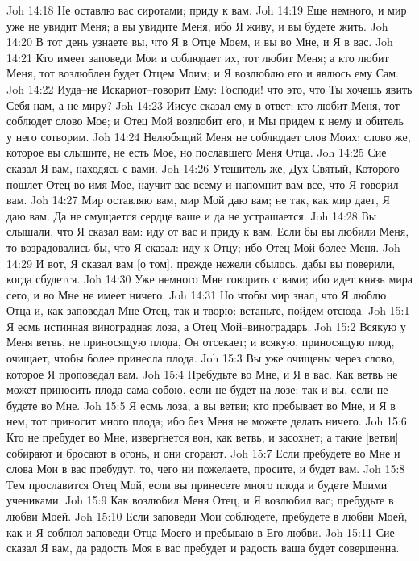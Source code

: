 Joh 14:18  Не оставлю вас сиротами; приду к вам.
Joh 14:19  Еще немного, и мир уже не увидит Меня; а вы увидите Меня, ибо Я живу, и вы будете жить.
Joh 14:20  В тот день узнаете вы, что Я в Отце Моем, и вы во Мне, и Я в вас.
Joh 14:21  Кто имеет заповеди Мои и соблюдает их, тот любит Меня; а кто любит Меня, тот возлюблен будет Отцем Моим; и Я возлюблю его и явлюсь ему Сам.
Joh 14:22  Иуда--не Искариот--говорит Ему: Господи! что это, что Ты хочешь явить Себя нам, а не миру?
Joh 14:23  Иисус сказал ему в ответ: кто любит Меня, тот соблюдет слово Мое; и Отец Мой возлюбит его, и Мы придем к нему и обитель у него сотворим.
Joh 14:24  Нелюбящий Меня не соблюдает слов Моих; слово же, которое вы слышите, не есть Мое, но пославшего Меня Отца.
Joh 14:25  Сие сказал Я вам, находясь с вами.
Joh 14:26  Утешитель же, Дух Святый, Которого пошлет Отец во имя Мое, научит вас всему и напомнит вам все, что Я говорил вам.
Joh 14:27  Мир оставляю вам, мир Мой даю вам; не так, как мир дает, Я даю вам. Да не смущается сердце ваше и да не устрашается.
Joh 14:28  Вы слышали, что Я сказал вам: иду от вас и приду к вам. Если бы вы любили Меня, то возрадовались бы, что Я сказал: иду к Отцу; ибо Отец Мой более Меня.
Joh 14:29  И вот, Я сказал вам [о том], прежде нежели сбылось, дабы вы поверили, когда сбудется.
Joh 14:30  Уже немного Мне говорить с вами; ибо идет князь мира сего, и во Мне не имеет ничего.
Joh 14:31  Но чтобы мир знал, что Я люблю Отца и, как заповедал Мне Отец, так и творю: встаньте, пойдем отсюда.
Joh 15:1  Я есмь истинная виноградная лоза, а Отец Мой--виноградарь.
Joh 15:2  Всякую у Меня ветвь, не приносящую плода, Он отсекает; и всякую, приносящую плод, очищает, чтобы более принесла плода.
Joh 15:3  Вы уже очищены через слово, которое Я проповедал вам.
Joh 15:4  Пребудьте во Мне, и Я в вас. Как ветвь не может приносить плода сама собою, если не будет на лозе: так и вы, если не будете во Мне.
Joh 15:5  Я есмь лоза, а вы ветви; кто пребывает во Мне, и Я в нем, тот приносит много плода; ибо без Меня не можете делать ничего.
Joh 15:6  Кто не пребудет во Мне, извергнется вон, как ветвь, и засохнет; а такие [ветви] собирают и бросают в огонь, и они сгорают.
Joh 15:7  Если пребудете во Мне и слова Мои в вас пребудут, то, чего ни пожелаете, просите, и будет вам.
Joh 15:8  Тем прославится Отец Мой, если вы принесете много плода и будете Моими учениками.
Joh 15:9  Как возлюбил Меня Отец, и Я возлюбил вас; пребудьте в любви Моей.
Joh 15:10  Если заповеди Мои соблюдете, пребудете в любви Моей, как и Я соблюл заповеди Отца Моего и пребываю в Его любви.
Joh 15:11  Сие сказал Я вам, да радость Моя в вас пребудет и радость ваша будет совершенна.

